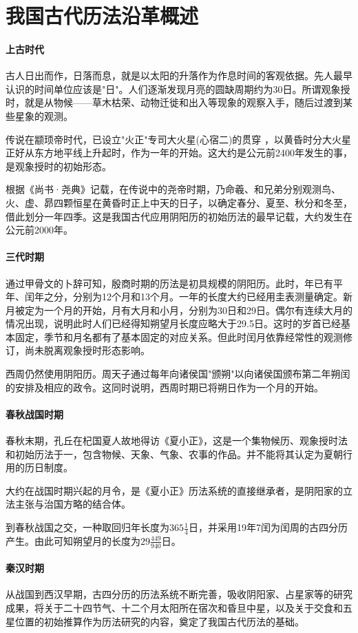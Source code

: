 \section{我国古代历法沿革概述}
\paragraph{上古时代}
古人日出而作，日落而息，就是以太阳的升落作为作息时间的客观依据。先人最早认识的时间单位应该是"日"。人们逐渐发现月亮的圆缺周期约为30日。所谓观象授时，就是从物候——草木枯荣、动物迁徙和出入等现象的观察入手，随后过渡到某些星象的观测。

传说在颛顼帝时代，已设立"火正"专司大火星(心宿二)的贯穿 ，以黄昏时分大火星正好从东方地平线上升起时，作为一年的开始。这大约是公元前2400年发生的事，是观象授时的初始形态。

根据《尚书·尧典》记载，在传说中的尧帝时期，乃命羲、和兄弟分别观测鸟、火、虚、昴四颗恒星在黄昏时正上中天的日子，以确定春分、夏至、秋分和冬至，借此划分一年四季。这是我国古代应用阴阳历的初始历法的最早记载，大约发生在公元前2000年。
\paragraph{三代时期}
通过甲骨文的卜辞可知，殷商时期的历法是初具规模的阴阳历。此时，年已有平年、闰年之分，分别为12个月和13个月。一年的长度大约已经用圭表测量确定。新月被定为一个月的开始，月有大月和小月，分别为30日和29日。偶尔有连续大月的情况出现，说明此时人们已经得知朔望月长度应略大于29.5日。这时的岁首已经基本固定，季节和月名都有了基本固定的对应关系。但此时闰月依靠经常性的观测修订，尚未脱离观象授时形态影响。

西周仍然使用阴阳历。周天子通过每年向诸侯国"颁朔"以向诸侯国颁布第二年朔闰的安排及相应的政令。这同时说明，西周时期已将朔日作为一个月的开始。
\paragraph{春秋战国时期}
春秋末期，孔丘在杞国夏人故地得访《夏小正》，这是一个集物候历、观象授时法和初始历法于一，包含物候、天象、气象、农事的作品。并不能将其认定为夏朝行用的历日制度。

大约在战国时期兴起的月令，是《夏小正》历法系统的直接继承者，是阴阳家的立法主张与治国方略的结合体。

到春秋战国之交，一种取回归年长度为$365\frac{1}{4}$日，并采用19年7闰为闰周的古四分历产生。由此可知朔望月的长度为$29\frac{449}{940}$日。
\paragraph{秦汉时期}
从战国到西汉早期，古四分历的历法系统不断完善，吸收阴阳家、占星家等的研究成果，将关于二十四节气、十二个月太阳所在宿次和昏旦中星，以及关于交食和五星位置的初始推算作为历法研究的内容，奠定了我国古代历法的基础。

